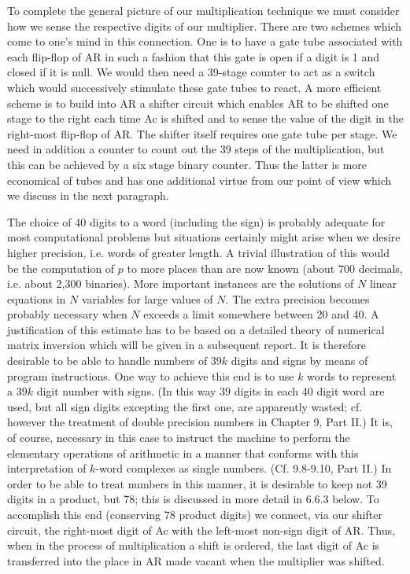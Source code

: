 \documentclass[12pt]{amsart}
\begin{document}
To complete the general picture of our multiplication technique we must consider how we sense the respective digits of our multiplier. There are two schemes which come to one's mind in this connection. One is to have a gate tube associated with each flip-flop of AR in such a fashion that this gate is open if a digit is 1 and closed if it is null. We would then need a 39-stage counter to act as a switch which would successively stimulate these gate tubes to react. A more efficient scheme is to build into AR a shifter circuit which enables AR to be shifted one stage to the right each time Ac is shifted and to sense the value of the digit in the right-most flip-flop of AR. The shifter itself requires one gate tube per stage. We need in addition a counter to count out the 39 steps of the multiplication, but this can be achieved by a six stage binary counter. Thus the latter is more economical of tubes and has one additional virtue from our point of view which we discuss in the next paragraph.

The choice of 40 digits to a word (including the sign) is probably adequate for most computational problems but situations certainly might arise when we desire higher precision, i.e. words of greater length. A trivial illustration of this would be the computation of $p$ to more places than are now known (about 700 decimals, i.e. about 2,300 binaries). More important instances are the solutions of $N$ linear equations in $N$ variables for large values of $N$. The extra precision becomes probably necessary when $N$ exceeds a limit somewhere between 20 and 40. A justification of this estimate has to be based on a detailed theory of numerical matrix inversion which will be given in a subsequent report. It is therefore desirable to be able to handle numbers of $39k$ digits and signs by means of program instructions. One way to achieve this end is to use $k$ words to represent a $39k$ digit number with signs. (In this way 39 digits in each 40 digit word are used, but all sign digits excepting the first one, are apparently wasted; cf. however the treatment of double precision numbers in Chapter 9, Part II.) It is, of course, necessary in this case to instruct the machine to perform the elementary operations of arithmetic in a manner that conforms with this interpretation of $k$-word complexes as single numbers. (Cf. 9.8-9.10, Part II.) In order to be able to treat numbers in this manner, it is desirable to keep not 39 digits in a product, but 78; this is discussed in more detail in 6.6.3 below. To accomplish this end (conserving 78 product digits) we connect, via our shifter circuit, the right-most digit of Ac with the left-most non-sign digit of AR. Thus, when in the process of multiplication a shift is ordered, the last digit of Ac is transferred into the place in AR made vacant when the multiplier was shifted.
\end{document}
